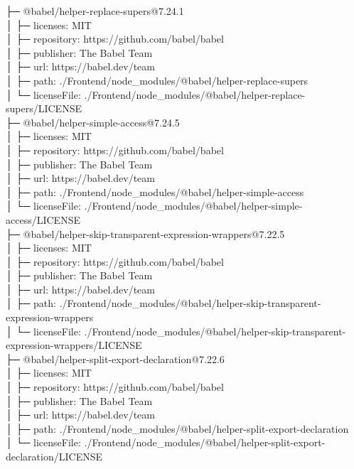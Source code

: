\documentclass[
    paper=a4,
    twoside=false,
    parskip=half,
    listof=entryprefix,
    listof=totoc,
    index=totoc,
    bibliography=totoc,
    headsepline,
]{scrbook}
\begin{document}
    ├─ @babel/helper-replace-supers@7.24.1\\
    │  ├─ licenses: MIT\\
    │  ├─ repository: https://github.com/babel/babel\\
    │  ├─ publisher: The Babel Team\\
    │  ├─ url: https://babel.dev/team\\
    │  ├─ path: ./Frontend/node\_modules/@babel/helper-replace-supers\\
    │  └─ licenseFile: ./Frontend/node\_modules/@babel/helper-replace-supers/LICENSE\\
    ├─ @babel/helper-simple-access@7.24.5\\
    │  ├─ licenses: MIT\\
    │  ├─ repository: https://github.com/babel/babel\\
    │  ├─ publisher: The Babel Team\\
    │  ├─ url: https://babel.dev/team\\
    │  ├─ path: ./Frontend/node\_modules/@babel/helper-simple-access\\
    │  └─ licenseFile: ./Frontend/node\_modules/@babel/helper-simple-access/LICENSE\\
    ├─ @babel/helper-skip-transparent-expression-wrappers@7.22.5\\
    │  ├─ licenses: MIT\\
    │  ├─ repository: https://github.com/babel/babel\\
    │  ├─ publisher: The Babel Team\\
    │  ├─ url: https://babel.dev/team\\
    │  ├─ path: ./Frontend/node\_modules/@babel/helper-skip-transparent-expression-wrappers\\
    │  └─ licenseFile: ./Frontend/node\_modules/@babel/helper-skip-transparent-expression-wrappers/LICENSE\\
    ├─ @babel/helper-split-export-declaration@7.22.6\\
    │  ├─ licenses: MIT\\
    │  ├─ repository: https://github.com/babel/babel\\
    │  ├─ publisher: The Babel Team\\
    │  ├─ url: https://babel.dev/team\\
    │  ├─ path: ./Frontend/node\_modules/@babel/helper-split-export-declaration\\
    │  └─ licenseFile: ./Frontend/node\_modules/@babel/helper-split-export-declaration/LICENSE\\
\end{document}
